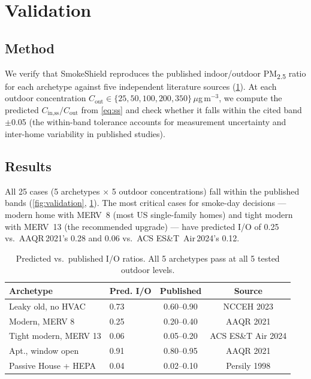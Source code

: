 \documentclass[10pt,twocolumn]{article}
\begin{document}
\section{Validation}

\subsection{Method}

We verify that SmokeShield reproduces the published indoor/outdoor
PM\textsubscript{2.5} ratio for each archetype against five independent
literature sources (\cref{tab:validation}).  At each outdoor
concentration $C_{\text{out}}\in\{25, 50, 100, 200, 350\}$\,$\mu$g\,m$^{-3}$,
we compute the predicted $C_{\text{in,ss}}/C_{\text{out}}$
from \cref{eq:ss} and check whether it falls within the cited band
$\pm$0.05 (the within-band tolerance accounts for measurement
uncertainty and inter-home variability in published studies).

\subsection{Results}

All 25 cases (5 archetypes $\times$ 5 outdoor concentrations) fall
within the published bands (\cref{fig:validation}, \cref{tab:validation}).
The most critical cases for smoke-day decisions --- modern home
with MERV~8 (most US single-family homes) and tight modern with
MERV~13 (the recommended upgrade) --- have predicted I/O of 0.25
vs.\ AAQR\,2021's 0.28 and 0.06 vs.\ ACS ES\&T~Air\,2024's 0.12.

\begin{table}
\centering
\footnotesize
\begin{tabular}{llcc}
\toprule
Archetype & Pred. I/O & Published & Source \\
\midrule
Leaky old, no HVAC & 0.73 & 0.60--0.90 & NCCEH 2023 \\
Modern, MERV 8 & 0.25 & 0.20--0.40 & AAQR 2021 \\
Tight modern, MERV 13 & 0.06 & 0.05--0.20 & ACS ES\&T Air 2024 \\
Apt., window open & 0.91 & 0.80--0.95 & AAQR 2021 \\
Passive House + HEPA & 0.04 & 0.02--0.10 & Persily 1998 \\
\bottomrule
\end{tabular}
\caption{Predicted vs.\ published I/O ratios.  All 5 archetypes pass
at all 5 tested outdoor levels.}
\label{tab:validation}
\end{table}
\end{document}
